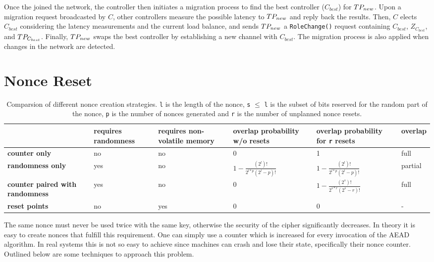 Once the \tp joined the network, the controller then initiates a migration process to
find the best controller ($C_{best}$) for $TP_{new}$. Upon a migration request broadcasted
by $C$, other controllers measure the possible latency to $TP_{new}$ and reply back
the results. Then, $C$ elects $C_{best}$ considering the latency measurements and the
current load balance, and sends $TP_{new}$ a \texttt{RoleChange()} request containing
$C_{best}$, $Z_{C_{best}}$, and $TP_{C_{best}}$. Finally, $TP_{new}$ swaps the best
controller by establishing a new channel with $C_{best}$. The migration process
is also applied when changes in the network are detected.


\section{Nonce Reset}
\label{sec:nonce}

\begin{table}[htb]
	\footnotesize
	\caption{Comparsion of different nonce creation strategies. \texttt{l} is the length of the
		nonce, \texttt{s} $\leq$ \texttt{l} is the subset of bits reserved for the random part of the nonce,
		\texttt{p} is the number of nonces generated and \texttt{r} is the number of unplanned nonce
	resets.}
	\label{tab:nonce}
	\renewcommand\arraystretch{2}
	\begin{tabularx}{1.1\linewidth}{|X|X|X|X|X|X|}
		\hline
		& \textbf{requires randomness} & \textbf{requires non-volatile memory} & \textbf{overlap probability w/o
		resets}  & \textbf{overlap probability for \texttt{r} resets} & \textbf{overlap}   \\
		\hline
		\textbf{counter only} & no & no  & 0 & 1 & full \\
		\hline
		\textbf{randomness only}                & yes & no  &
		$1-\frac{(2^l)!}{2^{l*p}(2^l-p)!}$
		& $1-\frac{(2^l)!}{2^{l*p}(2^l-p)!}$ & partial \\
		\hline
		\textbf{counter paired with randomness} & yes & no  & 0 & $1-\frac{(2^s)!}{2^{s*r}(2^s-r)!}$
		& full \\
		\hline
		\textbf{reset points} & no & yes & 0 & 0 & -    \\
		\hline
	\end{tabularx}%
\end{table}


The same nonce must never be used twice with the same key, otherwise the security of the
cipher significantly decreases. In theory it is easy to create nonces that fulfill this
requirement. One can simply use a counter which is increased for every invocation of the
AEAD algorithm. In real systems this is not so easy to achieve since machines can crash
and lose their state, specifically their nonce counter. Outlined below are some techniques
to approach this problem.

